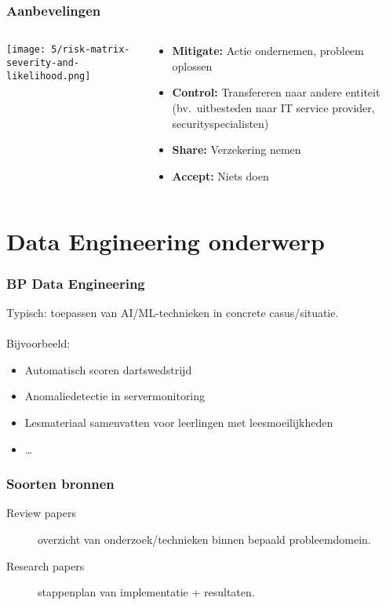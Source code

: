 \documentclass[aspectratio=169]{beamer}
\begin{document}
\begin{frame}
  \frametitle{Aanbevelingen}

  \begin{columns}
    \begin{column}{.5\textwidth}
      \texttt{[image: 5/risk-matrix-severity-and-likelihood.png]}
    \end{column}

    \begin{column}{.5\textwidth}
      \begin{itemize}
        \item \textbf{Mitigate:} Actie ondernemen, probleem oplossen
        \item \textbf{Control:} Transfereren naar andere entiteit (bv.\ uitbesteden naar IT service provider, securityspecialisten)
        \item \textbf{Share:} Verzekering nemen
        \item \textbf{Accept:} Niets doen
      \end{itemize}
    \end{column}
  \end{columns}

\end{frame}

\section{Data Engineering onderwerp}

\begin{frame}
  \frametitle{BP Data Engineering}

  Typisch: toepassen van AI/ML-technieken in concrete casus/situatie.
  \\\\
  Bijvoorbeeld:

  \begin{itemize}
    \item Automatisch scoren dartswedstrijd
    \item Anomaliedetectie in servermonitoring
    \item Lesmateriaal samenvatten voor leerlingen met leesmoeilijkheden
    \item \ldots
  \end{itemize}

\end{frame}

\begin{frame}
  \frametitle{Soorten bronnen}

  \begin{description}
    \item[Review papers] overzicht van onderzoek/technieken binnen bepaald probleemdomein.
    \item[Research papers] stappenplan van implementatie + resultaten.
  \end{description}

\end{frame}
\end{document}
